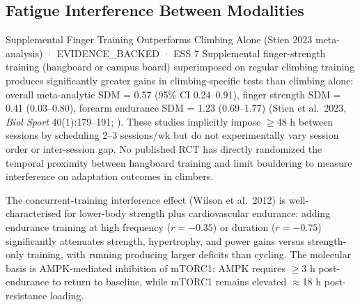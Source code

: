 \subsection{Fatigue Interference Between Modalities}
\label{subsec:fatigue_interference}

\begin{evidencebox}{Supplemental Finger Training Outperforms Climbing Alone (Stien 2023 meta-analysis) · EVIDENCE\_BACKED · ESS 7}
Supplemental finger-strength training (hangboard or campus board) superimposed on regular climbing training produces significantly greater gains in climbing-specific tests than climbing alone: overall meta-analytic SDM = 0.57 (95\% CI 0.24–0.91), finger strength SDM = 0.41 (0.03–0.80), forearm endurance SDM = 1.23 (0.69–1.77) (Stien et al.\ 2023, \textit{Biol Sport} 40(1):179–191; \cite{SO23}). These studies implicitly impose $\geq$48 h between sessions by scheduling 2–3 sessions/wk but do not experimentally vary session order or inter-session gap. No published RCT has directly randomized the temporal proximity between hangboard training and limit bouldering to measure interference on adaptation outcomes in climbers.

The concurrent-training interference effect (Wilson et al.\ 2012) is well-characterised for lower-body strength plus cardiovascular endurance: adding endurance training at high frequency ($r = -0.35$) or duration ($r = -0.75$) significantly attenuates strength, hypertrophy, and power gains versus strength-only training, with running producing larger deficits than cycling. The molecular basis is AMPK-mediated inhibition of mTORC1: AMPK requires $\geq$3 h post-endurance to return to baseline, while mTORC1 remains elevated $\approx$18 h post-resistance loading.
\end{evidencebox}


